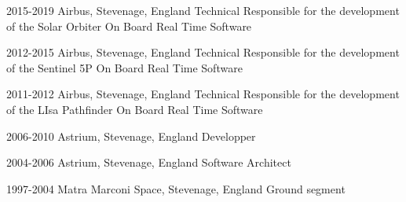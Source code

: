 
\begin{cventries}

\cventry
{2015-2019}
{Airbus, Stevenage, England}
{Technical Responsible for the development of the Solar Orbiter On Board Real Time Software}

\cventry
{2012-2015}
{Airbus, Stevenage, England}
{Technical Responsible for the development of the Sentinel 5P On Board Real Time Software}

\cventry
{2011-2012}
{Airbus, Stevenage, England}
{Technical Responsible for the development of the LIsa Pathfinder On Board Real Time Software}

\cventry
{2006-2010}
{Astrium, Stevenage, England}
{Developper}

\cventry
{2004-2006}
{Astrium, Stevenage, England}
{Software Architect}

\cventry
{1997-2004}
{Matra Marconi Space, Stevenage, England}
{Ground segment}

\end{cventries}
